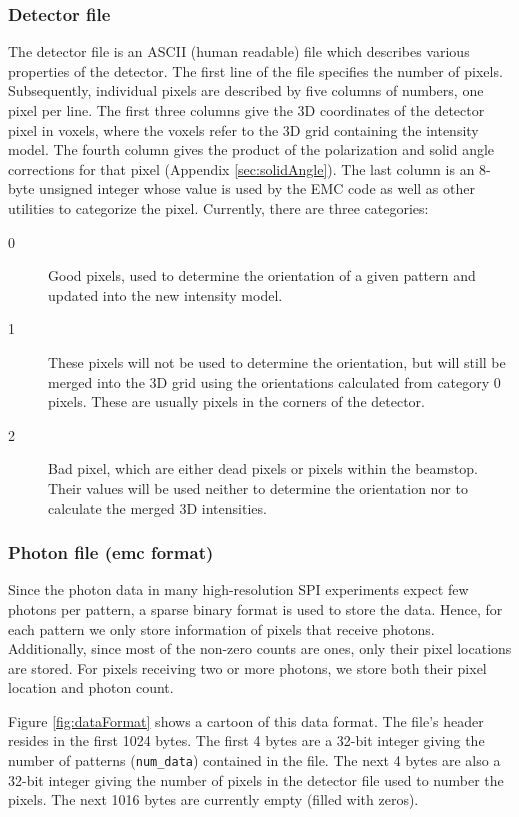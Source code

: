 \documentclass[]{iucr}              %
\begin{document}
\subsubsection{Detector file}\label{subsubsec:detector}
The detector file is an ASCII (human readable) file which describes various properties of the detector. The first line of the file specifies the number of pixels. Subsequently, individual pixels are described by five columns of numbers, one pixel per line. The first three columns give the 3D coordinates of the detector pixel in voxels, where the voxels refer to the 3D grid containing the intensity model. The fourth column gives the product of the polarization and solid angle corrections for that pixel (Appendix \ref{sec:solidAngle}). The last column is an 8-byte unsigned integer whose value is used by the EMC code as well as other utilities to categorize the pixel. Currently, there are three categories:
\begin{description}
\item[0]{Good pixels, used to determine the orientation of a given pattern and updated into the new intensity model.}
\item[1]{These pixels will not be used to determine the orientation, but will still be merged into the 3D grid using the orientations calculated from category 0 pixels. These are usually pixels in the corners of the detector.}
\item[2]{Bad pixel, which are either dead pixels or pixels within the beamstop. Their values will be used neither to determine the orientation nor to calculate the merged 3D intensities.}
\end{description}

\subsubsection{Photon file (emc format)}\label{subsubsec:emcformat}
Since the photon data in many high-resolution SPI experiments expect few photons per pattern, a sparse binary format is used to store the data. Hence, for each pattern we only store information of pixels that receive photons. Additionally, since most of the non-zero counts are ones, only their pixel locations are stored. For pixels receiving two or more photons, we store both their pixel location and photon count. 

Figure \ref{fig:dataFormat} shows a cartoon of this data format. The file's header resides in the first 1024 bytes. The first 4 bytes are a 32-bit integer giving the number of patterns (\texttt{num\_data}) contained in the file. The next 4 bytes are also a 32-bit integer giving the number of pixels in the detector file used to number the pixels. The next 1016 bytes are currently empty (filled with zeros).
\end{document}
